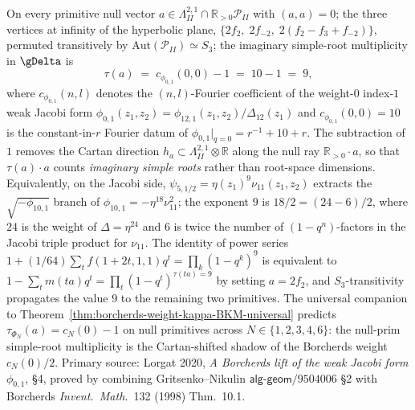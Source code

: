 \begin{remark}[Null-primitive simple-root multiplicity \texorpdfstring{$\tau(a) = 9$}{tau(a) = 9}]
\label{rem:tau-null-prim-nine}
On every primitive null vector $a \in \Lambda^{2,1}_{II} \cap
\mathbb{R}_{>0}\mathcal{P}_{II}$ with $(a, a) = 0$; the three
vertices at infinity of the hyperbolic plane, $\{2f_2,\; 2f_{-2},\;
2(f_2 - f_3 + f_{-2})\}$, permuted transitively by
$\mathrm{Aut}(\mathcal{P}_{II}) \simeq S_3$; the imaginary
simple-root multiplicity in $\gDelta$ is
\begin{equation}
\label{eq:tau-null-prim-nine}
\tau(a) \;=\; c_{\phi_{0,1}}(0, 0) - 1 \;=\; 10 - 1 \;=\; 9,
\end{equation}
where $c_{\phi_{0,1}}(n, l)$ denotes the $(n, l)$-Fourier coefficient
of the weight-$0$ index-$1$ weak Jacobi form
$\phi_{0,1}(z_1, z_2) = \phi_{12,1}(z_1, z_2)/\Delta_{12}(z_1)$ and
$c_{\phi_{0,1}}(0, 0) = 10$ is the constant-in-$r$ Fourier datum of
$\phi_{0,1}|_{q = 0} = r^{-1} + 10 + r$. The subtraction of $1$
removes the Cartan direction $h_a \subset \Lambda^{2,1}_{II} \otimes
\mathbb{R}$ along the null ray $\mathbb{R}_{>0}\cdot a$, so that
$\tau(a) \cdot a$ counts \emph{imaginary simple roots} rather than
root-space dimensions. Equivalently, on the Jacobi side,
$\psi_{5, 1/2} = \eta(z_1)^9 \nu_{11}(z_1, z_2)$ extracts the
$\sqrt{-\phi_{10,1}}$ branch of
$\phi_{10,1} = -\eta^{18}\nu_{11}^2$; the exponent $9$ is
$18/2 = (24 - 6)/2$, where $24$ is the weight of $\Delta = \eta^{24}$
and $6$ is twice the number of $(1 - q^n)$-factors in the Jacobi
triple product for $\nu_{11}$. The identity of power series
$1 + (1/64)\sum_t f(1 + 2t, 1, 1) q^t = \prod_k (1 - q^k)^9$ is
equivalent to $1 - \sum_t m(ta) q^t = \prod_t (1 - q^t)^{\tau(ta) = 9}$
by setting $a = 2f_2$, and $S_3$-transitivity propagates the value
$9$ to the remaining two primitives. The universal companion to
Theorem~\ref{thm:borcherds-weight-kappa-BKM-universal} predicts
$\tau_{\Phi_N}(a) = c_N(0) - 1$ on null primitives across
$N \in \{1, 2, 3, 4, 6\}$: the null-prim simple-root multiplicity
is the Cartan-shifted shadow of the Borcherds weight
$c_N(0)/2$. Primary source: Lorgat 2020, \emph{A Borcherds lift of
the weak Jacobi form $\phi_{0,1}$}, \S 4, proved by combining
Gritsenko--Nikulin $\mathsf{alg\text{-}geom}/9504006$ \S 2 with
Borcherds \emph{Invent.\ Math.}~132 (1998) Thm.~10.1.
\end{remark}

